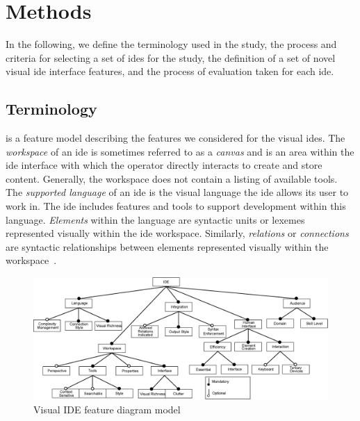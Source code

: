 \section{Methods} \label{sec:methods}

In the following, we define the terminology used in the study, the process and criteria for selecting a set of \acp{ide} for the study, the definition of a set of novel visual \ac{ide} interface features, and the process of evaluation taken for each \ac{ide}.


\subsection{Terminology} \label{subsec:terminology}

 is a feature model describing the features we considered for the visual \acp{ide}.
The \emph{workspace} of an \ac{ide} is sometimes referred to as a
\emph{canvas} and is an area within the \ac{ide} interface with which the
operator directly interacts to create and store content. Generally, the
workspace does not contain a listing of available tools. The \emph{supported
language} of an \ac{ide} is the visual language the \ac{ide} allows its
user to work in. The \ac{ide} includes features and tools to support
development within this language. \emph{Elements} within the language are
syntactic units or lexemes represented visually within the \ac{ide}
workspace. Similarly, \emph{relations} or \emph{connections} are syntactic
relationships between elements represented visually within the workspace~\cite{costagliola2002}.
%
\begin{figure}
  \centering
  \includegraphics[width=\textwidth]{images/ide_feature_model}
  \caption{Visual IDE feature diagram model}
  \label{fig:featuremodel}
\end{figure}


